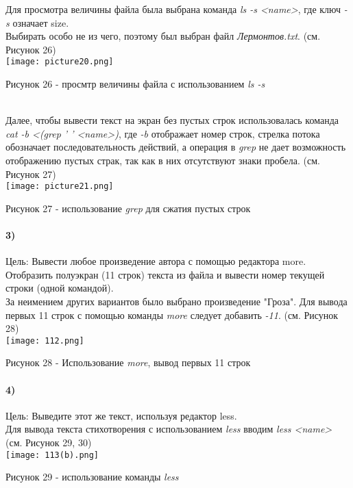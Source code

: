 		Для просмотра величины файла была выбрана команда \textit{ls -s <name>}, 		где ключ \textit{-s} означает size. \\ 
	Выбирать особо не из чего, поэтому был выбран файл \textit{Лермонтов.txt}. (см. Рисунок 26) \\
	\texttt{[image: picture20.png]}\\ 
		\centerline{Рисунок 26 - просмтр величины файла с использованием \textit{ls -s}}\\

		Далее, чтобы вывести текст на экран без пустых строк использовалась команда 	\textit{cat -b <(grep ' ' <name>)}, где \textit{-b} отображает номер строк, 		стрелка потока обозначает последовательность действий, а операция в  				\textit{grep} не дает возможность отображению пустых страк, так как в них 			отсутствуют знаки пробела.  (см. Рисунок 27)\\
	\texttt{[image: picture21.png]}\\
		\centerline{Рисунок 27 - использование \textit{grep} для сжатия пустых строк}

		\paragraph{3)}
		Цель: Вывести любое произведение автора с помощью редактора more. Отобразить полуэкран (11 строк) текста из файла и вывести номер текущей строки (одной командой).\\

		За неимением других вариантов было выбрано произведение "Гроза". Для вывода 	первых 11 строк с помощью команды \textit{more} следует добавить \textit{-11}.  (см. Рисунок 28)
	\\
	\texttt{[image: 112.png]}\\
		\centerline{Рисунок 28 - Использование \textit{more}, вывод первых 11 строк}

		\paragraph{4)}
		Цель: Выведите этот же текст, используя редактор less. \\

		Для вывода текста стихотворения с использованием \textit{less} вводим 			\textit{less <name>}  (см. Рисунок 29, 30)\\
	\texttt{[image: 113(b).png]}\\
		\centerline{Рисунок 29 - использование команды \textit{less}}


